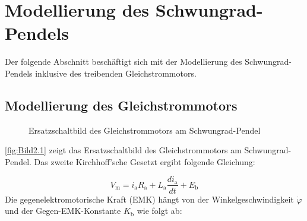 \pagestyle{aaron}
\section{Modellierung des Schwungrad-Pendels}\label{sec:Modellierung}

Der folgende Abschnitt beschäftigt sich mit der Modellierung des Schwungrad-Pendels inklusive des treibenden Gleichstrommotors.

\subsection{Modellierung des Gleichstrommotors}

\begin{figure}[H]
    \centering
    \caption[Ersatzschaltbild Gleichstrommotor]{Ersatzschaltbild des Gleichstrommotors am Schwungrad-Pendel}
    \label{fig:Bild2.1}
\end{figure}

\autoref{fig:Bild2.1} zeigt das Ersatzschaltbild des Gleichstrommotors am Schwungrad-Pendel. Das zweite Kirchhoff'sche Gesetzt ergibt folgende Gleichung:

\begin{equation} \label{eq:Gleichung2.1}
    V_{\mathrm{m}} = i_{\mathrm{a}} R_{\mathrm{a}} + L_{\mathrm{a}} \frac{di_{\mathrm{a}}}{dt} + E_{\mathrm{b}}
\end{equation}
\newline
Die gegenelektromotorische Kraft (EMK) hängt von der Winkelgeschwindigkeit $\dot\varphi$ und der Gegen-EMK-Konstante $K_{\mathrm{b}}$ wie folgt ab:

